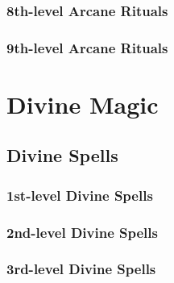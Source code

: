 \subsubsection{8th-level Arcane Rituals}
\begin{rituallist}
    \SLdiscernlocation
\end{rituallist}

\subsubsection{9th-level Arcane Rituals}
\begin{rituallist}
    \SLemancipation[Abjur]
    \SLantipathy[Ench]
    \SLsympathy
    \SLsoulbind[Vivi]
\end{rituallist}

\section{Divine Magic}\label{Divine Magic}

\subsection{Divine Spells}\label{Divine Spells}

\subsubsection{1st-level Divine Spells}
\begin{spelllist}
    \SLbane
    \SLbless
    \SLcurewounds
    \SLdetectalignment
    \SLentropicshield
    \SLholdperson
    \SLinflictwounds
    \SLprotectionfromalignment
    \SLregeneration
    \SLresistenergy
    \SLresistpoison
    \SLsanctuary
    \SLshieldoffaith
    \SLsummonmonster
\end{spelllist}

\subsubsection{2nd-level Divine Spells}
\begin{spelllist}
    \SLaid
    \SLcurseofbloodandbone
    \SLdiscernlies
    \SLdimensionalanchor
    \SLfreedom
    \SLmarkoftracking
    \SLplanardisruption
    \SLsearinglight
    \SLsharepain
    \SLsilence
    \SLtotemicmind
    \SLtotemicpower
\end{spelllist}

\subsubsection{3rd-level Divine Spells}
\begin{spelllist}
    \SLagony
    \SLcalmemotions
    \SLcommand
    \SLdeathknell
    \SLdiscernvulnerability
    \SLdispelmagic
    \SLdivinefavor
    \SLmightythrow
\end{spelllist}

